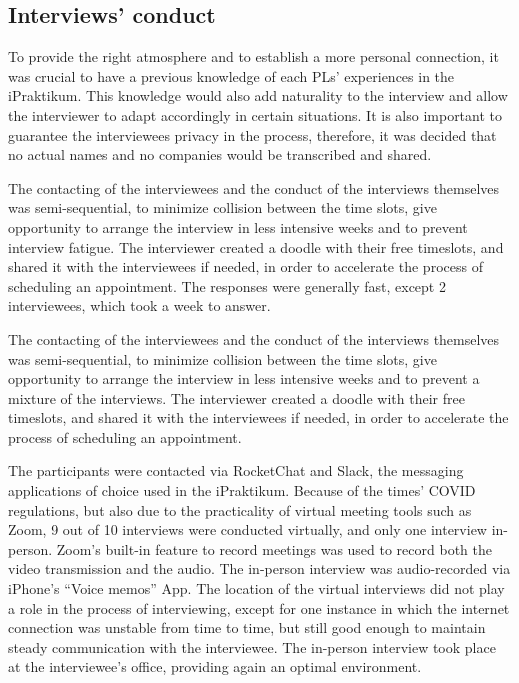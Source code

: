 \subsection{Interviews' conduct}

To provide the right atmosphere and to establish a more personal connection, it was crucial to have a previous knowledge of each PLs' experiences in the iPraktikum. This knowledge would also add naturality to the interview and allow the interviewer to adapt accordingly in certain situations. It is also important to guarantee the interviewees privacy in the process, therefore, it was decided that no actual names and no companies would be transcribed and shared. 

The contacting of the interviewees and the conduct of the interviews themselves was semi-sequential, to minimize collision between the time slots, give opportunity to arrange the interview in less intensive weeks and to prevent interview fatigue. The interviewer created a doodle with their free timeslots, and shared it with the interviewees if needed, in order to accelerate the process of scheduling an appointment. The responses were generally fast, except 2 interviewees, which took a week to answer.

The contacting of the interviewees and the conduct of the interviews themselves was semi-sequential, to minimize collision between the time slots, give opportunity to arrange the interview in less intensive weeks and to prevent a mixture of the interviews. The interviewer created a doodle with their free timeslots, and shared it with the interviewees if needed, in order to accelerate the process of scheduling an appointment.

The participants were contacted via RocketChat and Slack, the messaging applications of choice used in the iPraktikum. Because of the times’ COVID regulations, but also due to the practicality of virtual meeting tools such as Zoom, 9 out of 10 interviews were conducted virtually, and only one interview in-person. Zoom’s built-in feature to record meetings was used to record both the video transmission and the audio. The in-person interview was audio-recorded via iPhone’s “Voice memos” App. The location of the virtual interviews did not play a role in the process of interviewing, except for one instance in which the internet connection was unstable from time to time, but still good enough to maintain steady communication with the interviewee. The in-person interview took place at the interviewee’s office, providing again an optimal environment.

